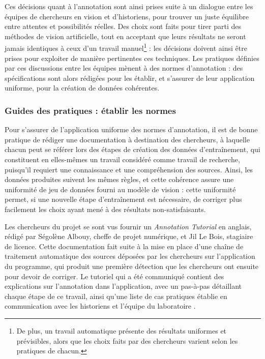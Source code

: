 	Ces décisions quant à l'annotation sont ainsi prises suite à un dialogue entre les équipes de chercheurs en vision et d'historiens, pour trouver un juste équilibre entre attentes et possibilités réelles. Des choix sont faits pour tirer parti des méthodes de vision artificielle, tout en acceptant que leurs résultats ne seront jamais identiques à ceux d'un travail manuel\footnote{De plus, un travail automatique présente des résultats uniformes et prévisibles, alors que les choix faits par des chercheurs varient selon les pratiques de chacun.} : les décisions doivent ainsi être prises pour exploiter de manière pertinentes ces techniques. Les pratiques définies par ces discussions entre les équipes mènent à des normes d'annotation : des spécifications sont alors rédigées pour les établir, et s'assurer de leur application uniforme, pour la création de données cohérentes.

    \subsubsection{Guides des pratiques : établir les normes}
	Pour s'assurer de l'application uniforme des normes d'annotation, il est de bonne pratique de rédiger une documentation à destination des chercheurs, à laquelle chacun peut se référer lors des étapes de création des données d'entraînement, qui constituent en elles-mêmes un travail considéré comme travail de recherche, puisqu'il requiert une connaissance et une compréhension des sources. Ainsi, les données produites suivent les mêmes règles, et cette cohérence assure une uniformité de jeu de données fourni au modèle de vision : cette uniformité permet, si une nouvelle étape d'entraînement est nécessaire, de corriger plus facilement les choix ayant mené à des résultats non-satisfaisants.
	
	Les chercheurs du projet \eida se sont vus fournir un \textit{Annotation Tutorial} en anglais, rédigé par Ségolène Albouy, cheffe de projet numérique, et Jil Le Bois, stagiaire de licence. Cette documentation fait suite à la mise en place d'une chaîne de traitement automatique des sources déposées par les chercheurs sur l'application du programme, qui produit une première détection que les chercheurs ont ensuite pour devoir de corriger. Le tutoriel qui a été communiqué contient des explications sur l'annotation dans l'application, avec un pas-à-pas détaillant chaque étape de ce travail, ainsi qu'une liste de cas pratiques établie en communication avec les historiens et l'équipe du laboratoire \imagine.
	
